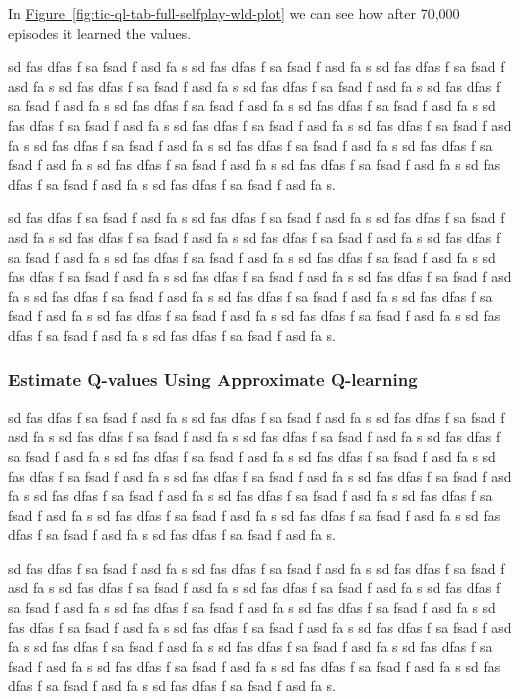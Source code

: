 \documentclass{article}
\begin{document}
In \hyperref[fig:tic-ql-tab-full-selfplay-wld-plot]
{Figure~\ref*{fig:tic-ql-tab-full-selfplay-wld-plot}} we can see how after 70,000 episodes it
learned the values.

sd fas dfas f sa fsad f asd fa s sd fas dfas f sa fsad f asd fa s sd fas dfas f sa fsad f asd fa s
sd fas dfas f sa fsad f asd fa s sd fas dfas f sa fsad f asd fa s sd fas dfas f sa fsad f asd fa s
sd fas dfas f sa fsad f asd fa s sd fas dfas f sa fsad f asd fa s sd fas dfas f sa fsad f asd fa s
sd fas dfas f sa fsad f asd fa s sd fas dfas f sa fsad f asd fa s sd fas dfas f sa fsad f asd fa s
sd fas dfas f sa fsad f asd fa s sd fas dfas f sa fsad f asd fa s sd fas dfas f sa fsad f asd fa s
sd fas dfas f sa fsad f asd fa s sd fas dfas f sa fsad f asd fa s sd fas dfas f sa fsad f asd fa s.

sd fas dfas f sa fsad f asd fa s sd fas dfas f sa fsad f asd fa s sd fas dfas f sa fsad f asd fa s
sd fas dfas f sa fsad f asd fa s sd fas dfas f sa fsad f asd fa s sd fas dfas f sa fsad f asd fa s
sd fas dfas f sa fsad f asd fa s sd fas dfas f sa fsad f asd fa s sd fas dfas f sa fsad f asd fa s
sd fas dfas f sa fsad f asd fa s sd fas dfas f sa fsad f asd fa s sd fas dfas f sa fsad f asd fa s
sd fas dfas f sa fsad f asd fa s sd fas dfas f sa fsad f asd fa s sd fas dfas f sa fsad f asd fa s
sd fas dfas f sa fsad f asd fa s sd fas dfas f sa fsad f asd fa s sd fas dfas f sa fsad f asd fa s.

\subsubsection{Estimate Q-values Using Approximate Q-learning}

sd fas dfas f sa fsad f asd fa s sd fas dfas f sa fsad f asd fa s sd fas dfas f sa fsad f asd fa s
sd fas dfas f sa fsad f asd fa s sd fas dfas f sa fsad f asd fa s sd fas dfas f sa fsad f asd fa s
sd fas dfas f sa fsad f asd fa s sd fas dfas f sa fsad f asd fa s sd fas dfas f sa fsad f asd fa s
sd fas dfas f sa fsad f asd fa s sd fas dfas f sa fsad f asd fa s sd fas dfas f sa fsad f asd fa s
sd fas dfas f sa fsad f asd fa s sd fas dfas f sa fsad f asd fa s sd fas dfas f sa fsad f asd fa s
sd fas dfas f sa fsad f asd fa s sd fas dfas f sa fsad f asd fa s sd fas dfas f sa fsad f asd fa s.

sd fas dfas f sa fsad f asd fa s sd fas dfas f sa fsad f asd fa s sd fas dfas f sa fsad f asd fa s
sd fas dfas f sa fsad f asd fa s sd fas dfas f sa fsad f asd fa s sd fas dfas f sa fsad f asd fa s
sd fas dfas f sa fsad f asd fa s sd fas dfas f sa fsad f asd fa s sd fas dfas f sa fsad f asd fa s
sd fas dfas f sa fsad f asd fa s sd fas dfas f sa fsad f asd fa s sd fas dfas f sa fsad f asd fa s
sd fas dfas f sa fsad f asd fa s sd fas dfas f sa fsad f asd fa s sd fas dfas f sa fsad f asd fa s
sd fas dfas f sa fsad f asd fa s sd fas dfas f sa fsad f asd fa s sd fas dfas f sa fsad f asd fa s.
\end{document}

